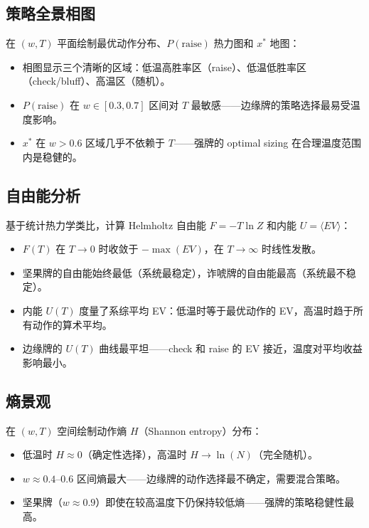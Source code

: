 \documentclass[12pt,a4paper]{ctexart}
\begin{document}
\subsection{策略全景相图}

在 $(w, T)$ 平面绘制最优动作分布、$P(\text{raise})$ 热力图和 $x^*$ 地图：
\begin{itemize}
    \item 相图显示三个清晰的区域：低温高胜率区（raise）、低温低胜率区（check/bluff）、高温区（随机）。
    \item $P(\text{raise})$ 在 $w \in [0.3, 0.7]$ 区间对 $T$ 最敏感——边缘牌的策略选择最易受温度影响。
    \item $x^*$ 在 $w > 0.6$ 区域几乎不依赖于 $T$——强牌的 optimal sizing 在合理温度范围内是稳健的。
\end{itemize}

\subsection{自由能分析}

基于统计热力学类比，计算 Helmholtz 自由能 $F = -T\ln Z$ 和内能 $U = \langle EV \rangle$：
\begin{itemize}
    \item $F(T)$ 在 $T \to 0$ 时收敛于 $-\max(EV)$，在 $T \to \infty$ 时线性发散。
    \item 坚果牌的自由能始终最低（系统最稳定），诈唬牌的自由能最高（系统最不稳定）。
    \item 内能 $U(T)$ 度量了系综平均 EV：低温时等于最优动作的 EV，高温时趋于所有动作的算术平均。
    \item 边缘牌的 $U(T)$ 曲线最平坦——check 和 raise 的 EV 接近，温度对平均收益影响最小。
\end{itemize}

\subsection{熵景观}

在 $(w, T)$ 空间绘制动作熵 $H$（Shannon entropy）分布：
\begin{itemize}
    \item 低温时 $H \approx 0$（确定性选择），高温时 $H \to \ln(N)$（完全随机）。
    \item $w \approx 0.4$--$0.6$ 区间熵最大——边缘牌的动作选择最不确定，需要混合策略。
    \item 坚果牌（$w \approx 0.9$）即使在较高温度下仍保持较低熵——强牌的策略稳健性最高。
\end{itemize}
\end{document}
